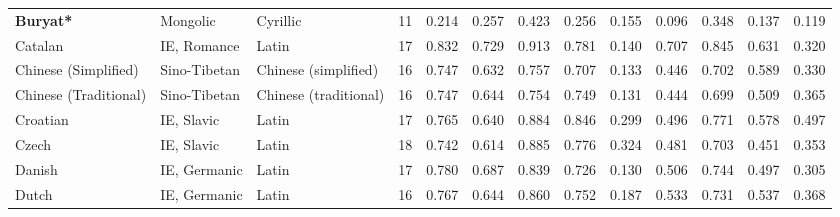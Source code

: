 \begin{tabular}{lllrrrrrrrrrr}
               \textbf{Buryat*} &                        Mongolic &              Cyrillic &        11 &                       0.214 &                         0.257 &         0.423 &                  0.256 &            0.155 &                         0.096 &         0.348 &                  0.137 &            0.119 \\
                        Catalan &                     IE, Romance &                 Latin &        17 &                       0.832 &                         0.729 &         0.913 &                  0.781 &            0.140 &                         0.707 &         0.845 &                  0.631 &            0.320 \\
           Chinese (Simplified) &                    Sino-Tibetan &  Chinese (simplified) &        16 &                       0.747 &                         0.632 &         0.757 &                  0.707 &            0.133 &                         0.446 &         0.702 &                  0.589 &            0.330 \\
          Chinese (Traditional) &                    Sino-Tibetan & Chinese (traditional) &        16 &                       0.747 &                         0.644 &         0.754 &                  0.749 &            0.131 &                         0.444 &         0.699 &                  0.509 &            0.365 \\
                       Croatian &                      IE, Slavic &                 Latin &        17 &                       0.765 &                         0.640 &         0.884 &                  0.846 &            0.299 &                         0.496 &         0.771 &                  0.578 &            0.497 \\
                          Czech &                      IE, Slavic &                 Latin &        18 &                       0.742 &                         0.614 &         0.885 &                  0.776 &            0.324 &                         0.481 &         0.703 &                  0.451 &            0.353 \\
                         Danish &                    IE, Germanic &                 Latin &        17 &                       0.780 &                         0.687 &         0.839 &                  0.726 &            0.130 &                         0.506 &         0.744 &                  0.497 &            0.305 \\
                          Dutch &                    IE, Germanic &                 Latin &        16 &                       0.767 &                         0.644 &         0.860 &                  0.752 &            0.187 &                         0.533 &         0.731 &                  0.537 &            0.368 \\

\end{tabular}
